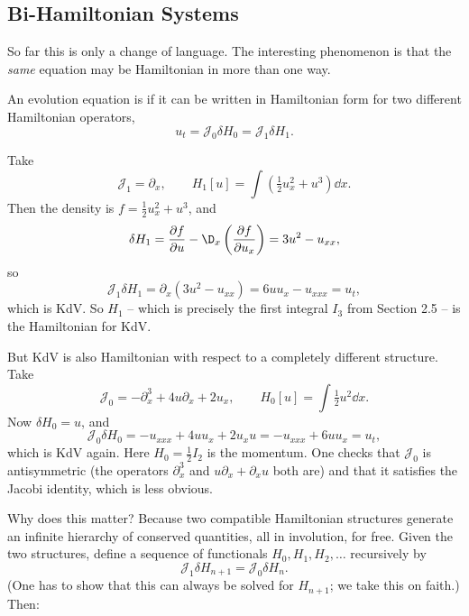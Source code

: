 \subsection{Bi-Hamiltonian Systems}

So far this is only a change of language. The interesting phenomenon is that the \emph{same} equation may be Hamiltonian in more than one way.

\begin{definition}[Bi-Hamiltonian]
	An evolution equation is  if it can be written in Hamiltonian form for two different Hamiltonian operators,
	$$
	u_t = \mathcal J_0\delta H_0 = \mathcal J_1\delta H_1.
	$$
\end{definition}

\begin{example}
	Take
	$$
	\mathcal J_1 = \partial_x, \qquad H_1[u] = \int\left(\tfrac{1}{2}u_x^2 + u^3\right)\dd x.
	$$
	Then the density is $f = \frac{1}{2}u_x^2 + u^3$, and
	$$
	\delta H_1 = \frac{\partial f}{\partial u} - \D_x\left(\frac{\partial f}{\partial u_x}\right) = 3u^2 - u_{xx},
	$$
	so
	$$
	\mathcal J_1\delta H_1 = \partial_x\left(3u^2 - u_{xx}\right) = 6uu_x - u_{xxx} = u_t,
	$$
	which is KdV. So $H_1$ -- which is precisely the first integral $I_3$ from Section 2.5 -- is the Hamiltonian for KdV.

	But KdV is also Hamiltonian with respect to a completely different structure. Take
	$$
	\mathcal J_0 = -\partial_x^3 + 4u\partial_x + 2u_x, \qquad H_0[u] = \int\tfrac{1}{2}u^2\dd x.
	$$
	Now $\delta H_0 = u$, and
	$$
	\mathcal J_0\delta H_0 = -u_{xxx} + 4uu_x + 2u_xu = -u_{xxx} + 6uu_x = u_t,
	$$
	which is KdV again. Here $H_0 = \frac{1}{2}I_2$ is the momentum. One checks that $\mathcal J_0$ is antisymmetric (the operators $\partial_x^3$ and $u\partial_x + \partial_xu$ both are) and that it satisfies the Jacobi identity, which is less obvious.
\end{example}

Why does this matter? Because two compatible Hamiltonian structures generate an infinite hierarchy of conserved quantities, all in involution, for free. Given the two structures, define a sequence of functionals $H_0, H_1, H_2,\dots$ recursively by
$$
\mathcal J_1\delta H_{n+1} = \mathcal J_0\delta H_n.
$$
(One has to show that this can always be solved for $H_{n+1}$; we take this on faith.) Then:

